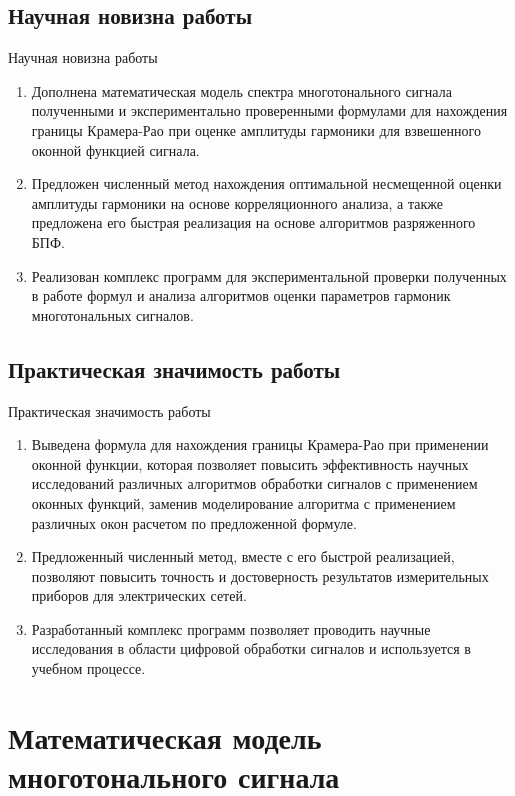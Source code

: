 \subsection{Научная новизна работы}
\begin{frame}{Научная новизна работы}
	\begin{enumerate}
		\item Дополнена математическая модель спектра многотонального сигнала  полученными и экспериментально проверенными формулами для нахождения границы Крамера-Рао при оценке амплитуды гармоники для взвешенного оконной функцией сигнала.
		\item Предложен численный метод нахождения оптимальной несмещенной оценки амплитуды гармоники на основе корреляционного анализа, а также предложена его быстрая реализация на основе алгоритмов разряженного БПФ.
		\item Реализован комплекс программ для экспериментальной проверки полученных в работе формул и анализа алгоритмов оценки параметров гармоник многотональных сигналов.
	\end{enumerate}	
\end{frame}

\subsection{Практическая значимость работы}
\begin{frame}{Практическая значимость работы}
	\begin{enumerate}
		\item Выведена формула для нахождения границы Крамера-Рао при применении оконной функции, которая позволяет повысить эффективность научных исследований различных алгоритмов обработки сигналов с применением оконных функций, заменив моделирование алгоритма с применением различных окон расчетом по предложенной формуле.
		\item Предложенный численный метод, вместе с его быстрой реализацией, позволяют повысить точность и достоверность результатов измерительных приборов для электрических сетей.
		\item Разработанный комплекс программ позволяет проводить научные исследования в области цифровой обработки сигналов и используется в учебном процессе.
	\end{enumerate}
\end{frame}

\section{Математическая модель многотонального сигнала}
